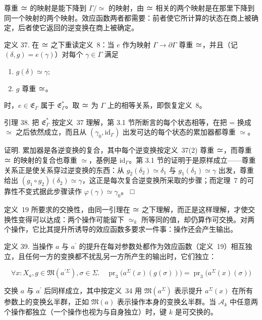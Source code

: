 尊重 ≃ 的映射是能下降到 \(\Gamma / \simeq\) 的映射，由 ≃ 相关的两个映射是在那里下降到同一个映射的两个映射。效应函数两者都需要：前者使它所计算的状态在商上被确定，后者使它返回的逆变换在商上被确定。

定义 37. 在 ≃ 之下重读定义~8：当 \(e\) 作为映射 \(\Gamma \to \partial \Gamma\) 尊重 ≃，并且（记 \(( \delta , g ) = e ( \gamma )\)）对每个 \(\gamma \in \Gamma\) 满足

\begin{enumerate}
\def\labelenumi{\arabic{enumi}.}
\tightlist
\item
  \(g ( \delta ) \simeq \gamma ;\)
\item
  \(g\) 尊重 ≃。
\end{enumerate}

时，\(e \in \mathfrak { E } _ { \Gamma }\) 属于 \(\mathfrak { E } _ { \Gamma } ^ { * }\)。取 ≃ 为 \(\Gamma\) 上的相等关系，即恢复定义~8。

引理 38. 把 \(\mathfrak { E } _ { \Gamma } ^ { * }\) 按定义~37 理解，第 3.1 节所断言的每个状态相等，在把 = 换成 \(\simeq\) 之后依然成立，而且从 \(( \gamma _ { 0 } , \mathrm { i d } _ { \Gamma } )\) 出发可达的每个状态的累加器都尊重 \(\simeq\)。

证明. 累加器是各逆变换的复合，其中每个逆变换按定义~37(2) 尊重 ≃，而尊重 ≃ 的映射的复合也尊重 \(\simeq\)，基例是 \(\mathrm { i d } _ { \Gamma }\)。第 3.1 节的证明于是原样成立——尊重关系正是使关系穿过逆变换的东西：从 \(g _ { 2 } ( \delta _ { 2 } ) \simeq \delta _ { 1 }\) 与 \(g _ { 1 } ( \delta _ { 1 } ) \simeq \gamma\) 出发，尊重给出 \(( g _ { 1 } \circ g _ { 2 } ) ( \delta _ { 2 } ) \simeq \gamma\)，这正是每次复合逆变换所采取的步骤；而定理~7 的可靠性不变式据此步骤读作 \(\varphi ( \gamma ) \simeq \gamma _ { 0 }\)。 □

定义~19 所要求的交换性，由同一引理在 ≃ 之下理解，而正是这样理解，才使交换性变得可以达成：两个操作可能留下 \(\simeq _ { k }\) 所等同的值，却仍算作可交换。对两个操作，它比其提升所诱导的效应函数多要求一件事：操作还会产生输出。

定义 39. 当操作 \(a\) 与 \(a ^ { \prime }\) 的提升在每对参数处都作为效应函数（定义~19）相互独立，且任何一方的变换都不扰乱另一方所产生的输出时，它们独立：

\[
\forall x : X _ { a } , g \in \mathfrak { M } ( a ^ { \prime \Sigma } ) , \sigma \in \Sigma . \quad \operatorname { p r } _ { 3 } \big ( a ^ { \Sigma } ( x ) ( g ( \sigma ) ) \big ) = \operatorname { p r } _ { 3 } \big ( a ^ { \Sigma } ( x ) ( \sigma ) \big )\tag{35}
\]

交换 \(a\) 与 \(a ^ { \prime }\) 后同样成立，其中按定义~34 用 \(\mathfrak { M } ( a ^ { \Sigma } )\) 表示提升 \(a ^ { \Sigma } ( x )\) 在所有参数上的变换幺半群，正如 \(\mathfrak { M } ( a )\) 表示操作本身的变换幺半群。当 \(\mathcal { A } _ { k }\) 中任意两个操作都独立（一个操作也视为与自身独立）时，键 \(k\) 是可交换的。

